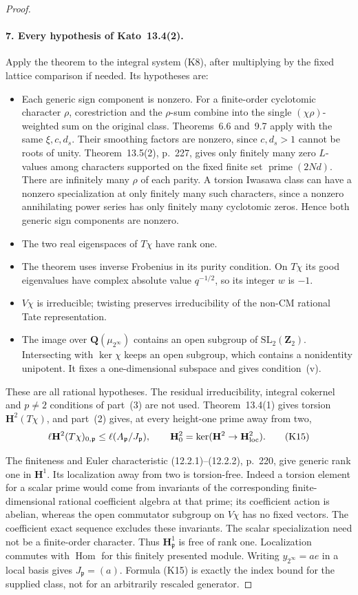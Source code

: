 \documentclass[11pt]{article}
\theoremstyle{definition}
\theoremstyle{remark}
\begin{document}
\begin{proof}
\paragraph{7. Every hypothesis of Kato~13.4(2).}
Apply the theorem to the integral system (K8), after multiplying
by the fixed lattice comparison if needed. Its hypotheses are:
\begin{itemize}
\item Each generic sign component is nonzero. For a finite-order
cyclotomic character $\rho$, corestriction and the $\rho$-sum combine
into the single $(\chi\rho)$-weighted sum on the original class.
Theorems~6.6 and~9.7 apply with the same $\xi,c,d_s$. Their smoothing
factors are nonzero, since $c,d_s>1$ cannot be roots of unity.
Theorem~13.5(2), p.~227, gives only finitely many zero $L$-values
among characters supported on the fixed finite set
$\operatorname{prime}(2Nd)$. There are infinitely many $\rho$ of
each parity. A torsion Iwasawa class can have a nonzero specialization
at only finitely many such characters, since a nonzero annihilating
power series has only finitely many cyclotomic zeros. Hence both
generic sign components are nonzero.
\item The two real eigenspaces of $T\chi$ have rank one.
\item The theorem uses inverse Frobenius in its purity condition.
On $T\chi$ its good eigenvalues have complex absolute value
$q^{-1/2}$, so its integer $w$ is $-1$.
\item $V\chi$ is irreducible; twisting preserves irreducibility of
the non-CM rational Tate representation.
\item The image over $\mathbf Q(\mu_{2^\infty})$ contains an open
subgroup of $\mathrm{SL}_2(\mathbf Z_2)$. Intersecting with
$\ker\chi$ keeps an open subgroup, which contains a nonidentity
unipotent. It fixes a one-dimensional subspace and gives condition~(v).
\end{itemize}
These are all rational hypotheses. The residual irreducibility,
integral cokernel and $p\ne2$ conditions of part~(3) are not used.
Theorem~13.4(1) gives torsion $\mathbf H^2(T\chi)$, and part~(2)
gives, at every height-one prime away from two,
\[
 \ell\mathbf H^2(T\chi)_{0,\mathfrak p}
       \leq\ell(A_{\mathfrak p}/J_{\mathfrak p}),\qquad
 \mathbf H^2_0=\ker(\mathbf H^2\to\mathbf H^2_{\rm loc}). \tag{K15}
\]

The finiteness and Euler characteristic (12.2.1)--(12.2.2), p.~220,
give generic rank one in $\mathbf H^1$. Its localization away
from two is torsion-free. Indeed a torsion element for a scalar
prime would come from invariants of the corresponding finite-dimensional
rational coefficient algebra at that prime; its coefficient action is
abelian, whereas the open commutator subgroup on $V\chi$ has no
fixed vectors. The coefficient exact sequence excludes these
invariants. The scalar specialization need not be a finite-order
character. Thus $\mathbf H^1_{\mathfrak p}$ is free of rank one.
Localization commutes with $\operatorname{Hom}$ for this finitely
presented module. Writing $y_{2^\infty}=a e$ in a local basis gives
$J_{\mathfrak p}=(a)$. Formula (K15) is exactly the index bound for
the supplied class, not for an arbitrarily rescaled generator.


\end{proof}
\end{document}
